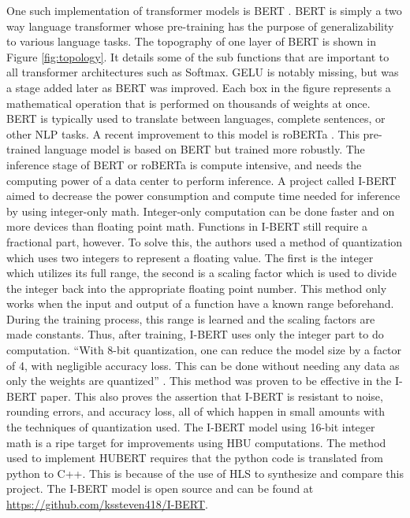 \documentclass[12pt]{article}
\begin{document}
	One such implementation of transformer models is BERT \cite{bert}. BERT is simply a two way language transformer whose pre-training has the purpose of generalizability to various language tasks. The topography of one layer of BERT is shown in Figure \ref{fig:topology}. It details some of the sub functions that are important to all transformer architectures such as Softmax. GELU is notably missing, but was a stage added later as BERT was improved. Each box in the figure represents a mathematical operation that is performed on thousands of weights at once. BERT is typically used to translate between languages, complete sentences, or other NLP tasks. A recent improvement to this model is roBERTa \cite{roberta}. This pre-trained language model is based on BERT but trained more robustly. The inference stage of BERT or roBERTa is compute intensive, and needs the computing power of a data center to perform inference. 
	A project called I-BERT \cite{ibert} aimed to decrease the power consumption and compute time needed for inference by using integer-only math. Integer-only computation can be done faster and on more devices than floating point math. Functions in I-BERT still require a fractional part, however. To solve this, the authors used a method of quantization which uses two integers to represent a floating value. The first is the integer which utilizes its full range, the second is a scaling factor which is used to divide the integer back into the appropriate floating point number. This method only works when the input and output of a function have a known range beforehand. During the training process, this range is learned and the scaling factors are made constants. Thus, after training, I-BERT uses only the integer part to do computation. “With 8-bit quantization, one can reduce the model size by a factor of 4, with negligible accuracy loss. This can be done without needing any data as only the weights are quantized” \cite{quantizing}. This method was proven to be effective in the I-BERT paper. This also proves the assertion that I-BERT is resistant to noise, rounding errors, and accuracy loss, all of which happen in small amounts with the techniques of quantization used. The I-BERT model using 16-bit integer math is a ripe target for improvements using HBU computations.
	The method used to implement HUBERT requires that the python code is translated from python to C++. This is because of the use of HLS to synthesize and compare this project. The I-BERT model is open source and can be found at \url{https://github.com/kssteven418/I-BERT}.
	
\end{document}
